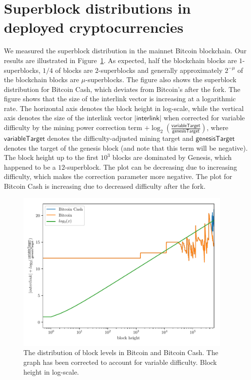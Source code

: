 \section{Superblock distributions in deployed cryptocurrencies}

We measured the superblock distribution in the mainnet Bitcoin blockchain. Our
results are illustrated in Figure~\ref{fig.btc-bch-superblocks}. As expected,
half the blockchain blocks are $1$-superblocks, $1/4$ of blocks are
$2$-superblocks and generally approximately $2^{-\mu}$ of the blockchain blocks
are $\mu$-superblocks. The figure also shows the superblock distribution for
Bitcoin Cash, which deviates from Bitcoin's after the fork. The figure shows
that the size of the interlink vector is increasing at a logarithmic rate. The
horizontal axis denotes the block height in log-scale, while the vertical axis
denotes the size of the interlink vector $|\textsf{interlink}|$ when corrected
for variable difficulty by the mining power correction term
$+ \log_2(\frac{\textsf{variableTarget}}{\textsf{genesisTarget}})$, where
$\textsf{variableTarget}$ denotes the difficulty-adjusted mining target
and $\textsf{genesisTarget}$ denotes the target of the genesis block (and note
that this term will be negative). The block height up to the first $10^3$ blocks
are dominated by Genesis, which happened to be a $12$-superblock. The plot can
be decreasing due to increasing difficulty, which makes the correction parameter
more negative. The plot for Bitcoin Cash is increasing due to decreased
difficulty after the fork.

\begin{figure}[h]
\begin{center}
  \includegraphics[width=0.95\textwidth]{figures/bitcoin-superblock-distribution.pdf}
  \caption{The distribution of block levels in Bitcoin and Bitcoin Cash. The
           graph has been corrected to account for variable difficulty. Block
           height in log-scale.}
  \label{fig.btc-bch-superblocks}
  \end{center}
\end{figure}
